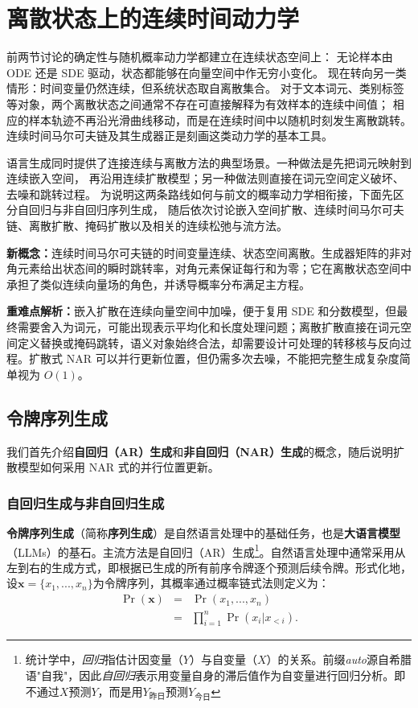 \documentclass[UTF8,a4paper,zihao=-4,oneside,openany]{ctexbook}
\begin{document}
\section{离散状态上的连续时间动力学}
\label{sec:diffusion-models-in-language}

前两节讨论的确定性与随机概率动力学都建立在连续状态空间上：
无论样本由 ODE 还是 SDE 驱动，状态都能够在向量空间中作无穷小变化。
现在转向另一类情形：时间变量仍然连续，但系统状态取自离散集合。
对于文本词元、类别标签等对象，两个离散状态之间通常不存在可直接解释为有效样本的连续中间值；
相应的样本轨迹不再沿光滑曲线移动，而是在连续时间中以随机时刻发生离散跳转。
连续时间马尔可夫链及其生成器正是刻画这类动力学的基本工具。

语言生成同时提供了连接连续与离散方法的典型场景。一种做法是先把词元映射到连续嵌入空间，
再沿用连续扩散模型；另一种做法则直接在词元空间定义破坏、去噪和跳转过程。
为说明这两条路线如何与前文的概率动力学相衔接，下面先区分自回归与非自回归序列生成，
随后依次讨论嵌入空间扩散、连续时间马尔可夫链、离散扩散、掩码扩散以及相关的连续松弛与流方法。

\begin{importantnote}
\textbf{新概念：}连续时间马尔可夫链的时间变量连续、状态空间离散。生成器矩阵的非对角元素给出状态间的瞬时跳转率，对角元素保证每行和为零；它在离散状态空间中承担了类似连续向量场的角色，并诱导概率分布满足主方程。

\textbf{重难点解析：}嵌入扩散在连续向量空间中加噪，便于复用 SDE 和分数模型，但最终需要舍入为词元，可能出现表示平均化和长度处理问题；离散扩散直接在词元空间定义替换或掩码跳转，语义对象始终合法，却需要设计可处理的转移核与反向过程。扩散式 NAR 可以并行更新位置，但仍需多次去噪，不能把完整生成复杂度简单视为 \(O(1)\)。
\end{importantnote}

\subsection{令牌序列生成}

我们首先介绍\textbf{自回归（AR）生成}和\textbf{非自回归（NAR）生成}的概念，随后说明扩散模型如何采用 NAR 式的并行位置更新。
\subsubsection{自回归生成与非自回归生成}

\textbf{令牌序列生成}（简称\textbf{序列生成}）是自然语言处理中的基础任务，也是\textbf{大语言模型}（LLMs）的基石\citep{radford-etal:2018improving}。主流方法是自回归（AR）生成\footnote{统计学中，\textit{回归}指估计因变量（$Y$）与自变量（$X$）的关系。前缀\textit{auto}源自希腊语"自我"，因此\textit{自回归}表示用变量自身的滞后值作为自变量进行回归分析。即不通过$X$预测$Y$，而是用$Y_{\text{昨日}}$预测$Y_{\text{今日}}$}。自然语言处理中通常采用从左到右的生成方式，即根据已生成的所有前序令牌逐个预测后续令牌。形式化地，设$\mathbf{x} = \{x_1,...,x_n\}$为令牌序列，其概率通过概率链式法则定义为：
\begin{eqnarray}
\Pr(\mathbf{x}) & = & \Pr(x_1,...,x_n) \nonumber \\
& = & \prod_{i=1}^{n} \Pr(x_i|x_{<i}).
\end{eqnarray}
\end{document}

